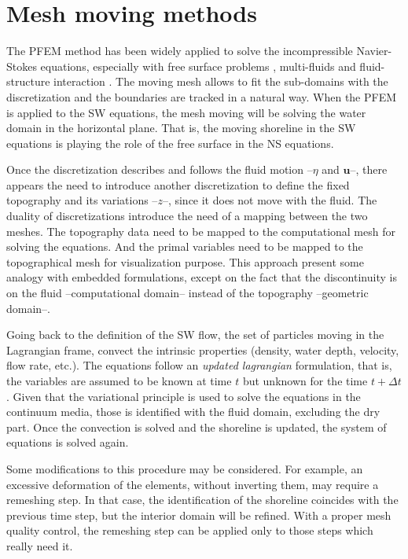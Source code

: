 \section{Mesh moving methods}


The PFEM method has been widely applied to solve the incompressible Navier-Stokes equations, especially with free surface problems \cite{larese2008}, multi-fluids \cite{mier2010} and fluid-structure interaction \cite{onate2008}.
The moving mesh allows to fit the sub-domains with the discretization and the boundaries are tracked in a natural way.
When the PFEM is applied to the SW equations, the mesh moving will be solving the water domain in the horizontal plane. That is, the moving shoreline in the SW equations is playing the role of the free surface in the NS equations.

Once the discretization describes and follows the fluid motion --$\eta$ and $\mathbf{u}$--, there appears the need to introduce another discretization to define the fixed topography and its variations --$z$--, since it does not move with the fluid. The duality of discretizations introduce the need of a mapping between the two meshes. The topography data need to be mapped to the computational mesh for solving the equations. And the primal variables need to be mapped to the topographical mesh for visualization purpose.
This approach present some analogy with embedded formulations, except on the fact that the discontinuity is on the fluid --computational domain-- instead of the topography --geometric domain--.

Going back to the definition of the SW flow, the set of particles moving in the Lagrangian frame, convect the intrinsic properties (density, water depth, velocity, flow rate, etc.). The equations follow an \emph{updated lagrangian} formulation, that is, the variables are assumed to be known at time $t$ but unknown for the time $t+\Delta t$. Given that the variational principle is used to solve the equations in the continuum media, those is identified with the fluid domain, excluding the dry part. Once the convection is solved and the shoreline is updated, the system of equations is solved again.

Some modifications to this procedure may be considered. For example, an excessive deformation of the elements, without inverting them, may require a remeshing step. In that case, the identification of the shoreline coincides with the previous time step, but the interior domain will be refined. With a proper mesh quality control, the remeshing step can be applied only to those steps which really need it.


